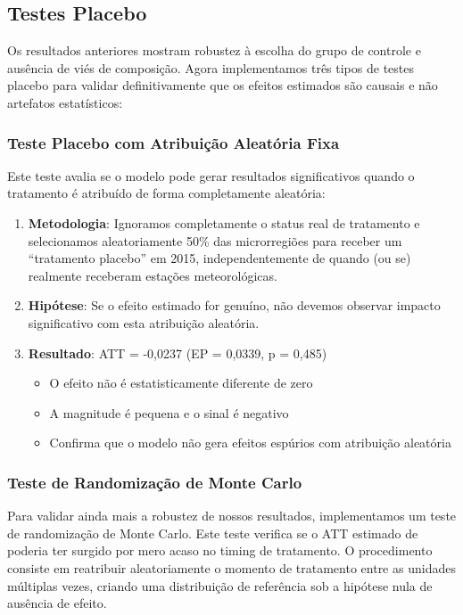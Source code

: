 \documentclass[
	12pt,				%
	oneside,			%
	a4paper,			%
	english,			%
	french,				%
	spanish,			%
	brazil				%
	]{abntex2}
\begin{document}
\subsection{Testes Placebo}

Os resultados anteriores mostram robustez à escolha do grupo de controle e ausência de viés de composição. Agora implementamos três tipos de testes placebo para validar definitivamente que os efeitos estimados são causais e não artefatos estatísticos:

\subsubsection{Teste Placebo com Atribuição Aleatória Fixa}

Este teste avalia se o modelo pode gerar resultados significativos quando o tratamento é atribuído de forma completamente aleatória:

\begin{enumerate}
\item \textbf{Metodologia}: Ignoramos completamente o status real de tratamento e selecionamos aleatoriamente 50\% das microrregiões para receber um ``tratamento placebo'' em 2015, independentemente de quando (ou se) realmente receberam estações meteorológicas.

\item \textbf{Hipótese}: Se o efeito estimado for genuíno, não devemos observar impacto significativo com esta atribuição aleatória.

\item \textbf{Resultado}: ATT = -0,0237 (EP = 0,0339, p = 0,485)
\begin{itemize}
\item O efeito não é estatisticamente diferente de zero
\item A magnitude é pequena e o sinal é negativo
\item Confirma que o modelo não gera efeitos espúrios com atribuição aleatória
\end{itemize}
\end{enumerate}

\subsubsection{Teste de Randomização de Monte Carlo}

Para validar ainda mais a robustez de nossos resultados, implementamos um teste de randomização de Monte Carlo. Este teste verifica se o ATT estimado de \mainatt{} poderia ter surgido por mero acaso no timing de tratamento. O procedimento consiste em reatribuir aleatoriamente o momento de tratamento entre as unidades múltiplas vezes, criando uma distribuição de referência sob a hipótese nula de ausência de efeito.
\end{document}
